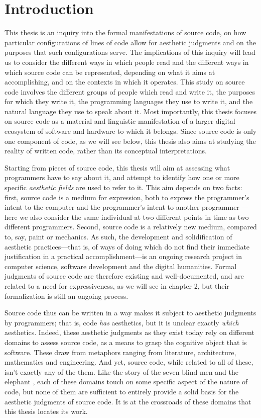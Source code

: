 \chapter{Introduction}

This thesis is an inquiry into the formal manifestations of source code, on how particular configurations of lines of code allow for aesthetic judgments and on the purposes that such configurations serve. The implications of this inquiry will lead us to consider the different ways in which people read and the different ways in which source code can be represented, depending on what it aims at accomplishing, and on the contexts in which it operates.
This study on source code involves the different groups of people which read and write it, the purposes for which they write it, the programming languages they use to write it, and the natural language they use to speak about it. Most importantly, this thesis focuses on source code as a material and linguistic manifestation of a larger digital ecosystem of software and hardware to which it belongs. Since source code is only one component of code, as we will see below, this thesis also aims at studying the reality of written code, rather than its conceptual interpretations.

Starting from pieces of source code, this thesis will aim at assessing what programmers have to say about it, and attempt to identify how one or more specific \emph{aesthetic fields} are used to refer to it. This aim depends on two facts: first, source code is a medium for expression, both to express the programmer's intent to the computer \citep{dijkstra_craftsman_1982} and the programmer's intent to another programmer \citep{abelson_structure_1979}—here we also consider the same individual at two different points in time as two different programmers. Second, source code is a relatively new medium, compared to, say, paint or mechanics. As such, the development and solidification of aesthetic practices—that is, of ways of doing which do not find their immediate justification in a practical accomplishment—is an ongoing research project in computer science, software development and the digital humanities. Formal judgments of source code are therefore existing and well-documented, and are related to a need for expressiveness, as we will see in chapter 2, but their formalization is still an ongoing process.

Source code thus can be written in a way makes it subject to aesthetic judgments by programmers; that is, code \emph{has} aesthetics, but it is unclear exactly \emph{which} aesthetics. Indeed, these aesthetic judgments as they exist today rely on different domains to assess source code, as a means to grasp the cognitive object that is software. These draw from metaphors ranging from literature, architecture, mathematics and engineering. And yet, source code, while related to all of these, isn't exactly any of the them. Like the story of the seven blind men and the elephant \citep{chun_sourcery_2008}, each of these domains touch on some specific aspect of the nature of code, but none of them are sufficient to entirely provide a solid basis for the aesthetic judgments of source code. It is at the crossroads of these domains that this thesis locates its work.

